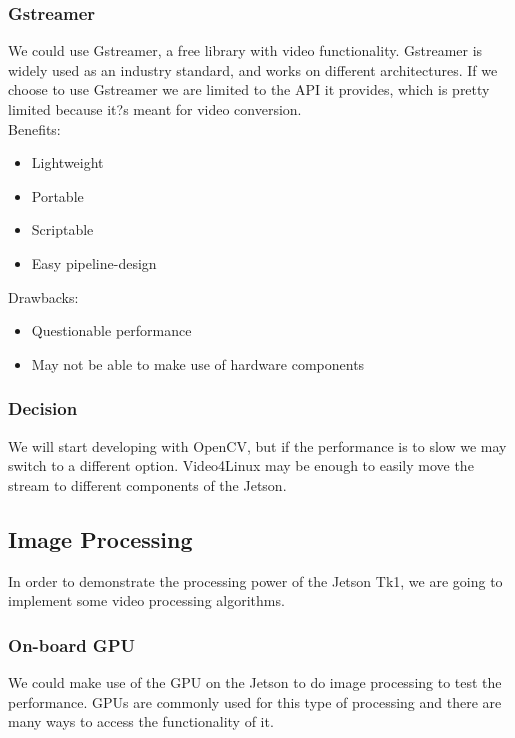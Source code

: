 	\subsubsection{Gstreamer}
	We could use Gstreamer, a free library with video functionality.
Gstreamer is widely used as an industry standard, and works on different architectures. If we choose to use Gstreamer we are limited to the API it provides, which is pretty limited because it?s meant for video conversion.\\
			
	Benefits:
	\begin{itemize}[leftmargin=2cm,labelindent=2cm]
		\item Lightweight
		\item Portable
		\item Scriptable
		\item Easy pipeline-design
	\end{itemize}
	
	Drawbacks:
	\begin{itemize}[leftmargin=2cm,labelindent=2cm]
		\item Questionable performance
		\item May not be able to make use of hardware components\\
	\end{itemize}
	
	\subsubsection{\textbf{Decision}}
	We will start developing with OpenCV, but if the performance is to slow we may switch to a different option. Video4Linux may be enough to easily move the stream to different components of the Jetson.
	
\subsection{Image Processing}
In order to demonstrate the processing power of the Jetson Tk1, we are going to implement some video processing algorithms.\\
	\subsubsection{On-board GPU}
	We could make use of the GPU on the Jetson to do image processing to test the performance. GPUs are commonly used for this type of processing and there are many ways to access the functionality of it.
		
